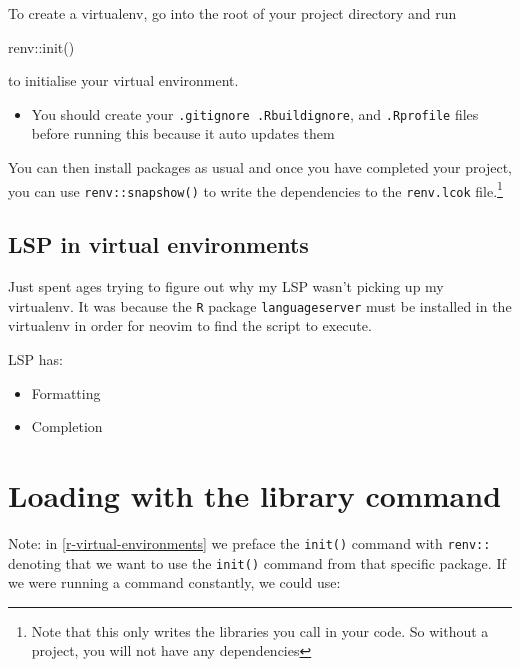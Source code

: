 \documentclass[
]{report}
\newenvironment{Shaded}{\begin{snugshade}}{\end{snugshade}}
\newcommand{\FunctionTok}[1]{\textcolor[rgb]{0.94,0.94,0.56}{#1}}
\newcommand{\NormalTok}[1]{\textcolor[rgb]{0.80,0.80,0.80}{#1}}
\newcommand{\SpecialCharTok}[1]{\textcolor[rgb]{0.86,0.64,0.64}{#1}}
\providecommand{\tightlist}{%
  \setlength{\itemsep}{0pt}\setlength{\parskip}{0pt}}
\renewenvironment{Shaded}{
	\bigskip
	\begin{tcolorbox}[drop fuzzy midday shadow]
		\begin{mdframed}[
				skipabove=\topskip*2,
				outerlinewidth= 0,
				linewidth=0pt,
				roundcorner= 3pt,
				backgroundcolor= shadecolor,
				outerlinecolor= shadecolor,
				innertopmargin= \topskip,
				innerbottommargin=\topskip,
				leftmargin=-0.8cm,
				rightmargin=-0.8cm
			]}{
		\end{mdframed}
	\end{tcolorbox}
	\smallskip
}
\theoremstyle{definition}
\theoremstyle{definition}
\theoremstyle{definition}
\theoremstyle{definition}
\theoremstyle{remark}
\begin{document}
To create a virtualenv, go into the root of your project directory and run

\begin{Shaded}
\begin{Highlighting}[numbers=left,,]
\NormalTok{renv}\SpecialCharTok{::}\FunctionTok{init}\NormalTok{()}
\end{Highlighting}
\end{Shaded}

to initialise your virtual environment.

\begin{itemize}
\tightlist
\item
  You should create your \texttt{.gitignore\ .Rbuildignore}, and \texttt{.Rprofile} files
  before running this because it auto updates them
\end{itemize}

You can then install packages as usual and once you have completed your
project, you can use \texttt{renv::snapshow()} to write the dependencies to the
\texttt{renv.lcok} file.\footnote{Note that this only writes the libraries you call in your
  code. So without a project, you will not have any dependencies}

\hypertarget{lsp-in-virtual-environments}{%
\subsection{LSP in virtual environments}\label{lsp-in-virtual-environments}}

Just spent ages trying to figure out why my LSP wasn't picking up my
virtualenv. It was because the \texttt{R} package \texttt{languageserver} must be installed
in the virtualenv in order for neovim to find the script to execute.

LSP has:

\begin{itemize}
\tightlist
\item
  Formatting
\item
  Completion
\end{itemize}

\hypertarget{loading-with-the-library-command}{%
\section{Loading with the library command}\label{loading-with-the-library-command}}

Note: in \ref{r-virtual-environments} we preface the \texttt{init()} command with \texttt{renv::} denoting that we want
to use the \texttt{init()} command from that specific package. If we were running a
command constantly, we could use:
\end{document}
